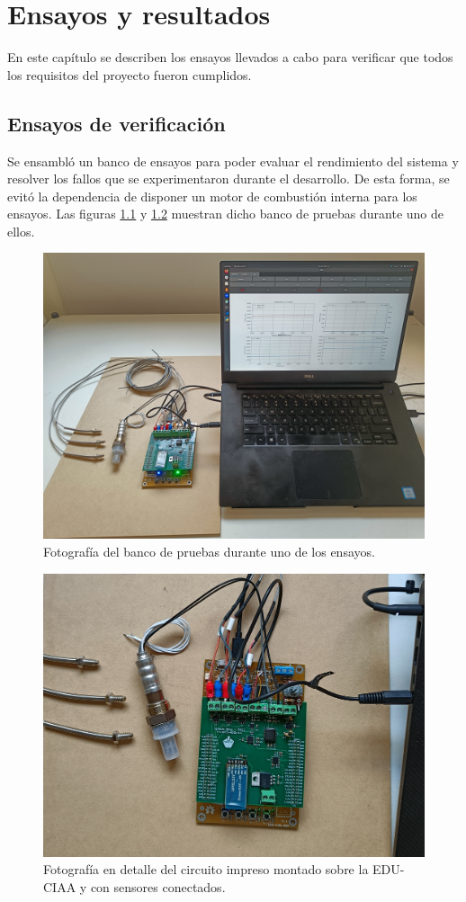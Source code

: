 \chapter{Ensayos y resultados}

\label{Chapter4}

En este capítulo se describen los ensayos llevados a cabo para verificar que todos los requisitos del proyecto fueron cumplidos.

\section{Ensayos de verificación}

Se ensambló un banco de ensayos para poder evaluar el rendimiento del sistema y resolver los fallos que se experimentaron durante el desarrollo. De esta forma, se evitó la dependencia de disponer un motor de combustión interna para los ensayos. Las figuras \ref{fig:banco-pruebas-1} y \ref{fig:banco-pruebas-2} muestran dicho banco de pruebas durante uno de ellos.

\begin{figure}[htpb]
\centering
\includegraphics[width=.85\textwidth]{./Figures/banco-pruebas-1.jpg}
\caption{Fotografía del banco de pruebas durante uno de los ensayos.}
\label{fig:banco-pruebas-1}
\end{figure}

\begin{figure}[htpb]
\centering
\includegraphics[width=.85\textwidth]{./Figures/banco-pruebas-2.jpg}
\caption{Fotografía en detalle del circuito impreso montado sobre la EDU-CIAA y con sensores conectados.}
\label{fig:banco-pruebas-2}
\end{figure}
\break
